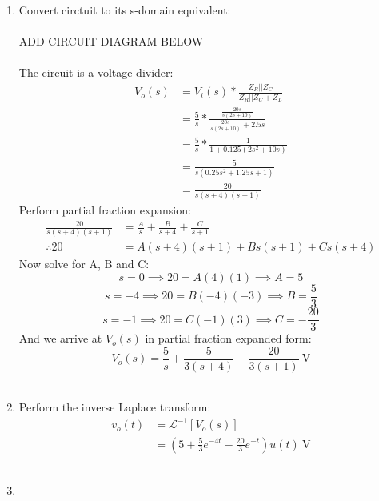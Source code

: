 \begin{enumerate}
	\item{
		Convert circtuit to its s-domain equivalent:
		\\ \\
		ADD CIRCUIT DIAGRAM BELOW
		\\ \\
		The circuit is a voltage divider:
		\begin{align*}
			V_o(s) &= V_i(s) * \frac{Z_R || Z_C}{Z_R || Z_C + Z_L} \\
			&= \frac{5}{s} * \frac{\frac{20s}{s(2s+10)}}{\frac{20s}{s(2s+10)}+2.5s} \\
			&= \frac{5}{s} * \frac{1}{1+0.125(2s^2+10s)} \\
			&= \frac{5}{s(0.25s^2+1.25s+1)} \\
			&= \frac{20}{s(s+4)(s+1)}
		\end{align*}
		Perform partial fraction expansion:
		\begin{align*}
			\frac{20}{s(s+4)(s+1)} &= \frac{A}{s} + \frac{B}{s+4} + \frac{C}{s+1} \\
			\therefore 20 &= A(s+4)(s+1) + Bs(s+1) + Cs(s+4)
		\end{align*}
		Now solve for A, B and C:
		\begin{equation*}
			s = 0 \implies 20 = A(4)(1) \implies A = 5
		\end{equation*}
		\begin{equation*}
			s = -4 \implies 20 = B(-4)(-3) \implies B = \frac{5}{3}
		\end{equation*}
		\begin{equation*}
			s = -1 \implies 20 = C(-1)(3) \implies C = -\frac{20}{3}
		\end{equation*}
		And we arrive at $V_o(s)$ in partial fraction expanded form:
		\begin{equation*}
			V_o(s) = \frac{5}{s} + \frac{5}{3(s+4)} - \frac{20}{3(s+1)} \ \mathrm{V}
		\end{equation*}
		\\
	}

	\item{
		Perform the inverse Laplace transform:
		\begin{align*}
			v_o(t) &= \mathcal{L}^{-1}\left[ V_o(s) \right] \\
			&= \left(5 + \frac{5}{3}e^{-4t} - \frac{20}{3}e^{-t} \right) u(t) \ \mathrm{V}
		\end{align*}
		\\
	}

	\item{
	
	}
\end{enumerate}
